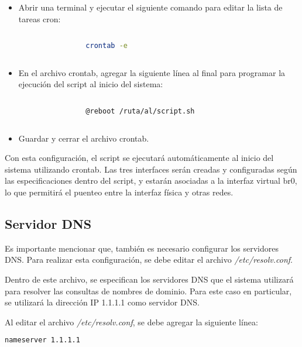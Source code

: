 		\begin{itemize}
		
			\item Abrir una terminal y ejecutar el siguiente comando para editar la lista de tareas cron:
	
			\begin{lstlisting}[language=Bash, caption=crontab]
	
				crontab -e
	
			\end{lstlisting}
	
			\item En el archivo crontab, agregar la siguiente línea al final para programar la ejecución del script al inicio del sistema:
	
			\begin{lstlisting}[language=Bash, caption=ruta del archivo]
	
				@reboot /ruta/al/script.sh
		
			\end{lstlisting}
	
			\item Guardar y cerrar el archivo crontab.
	
		\end{itemize}
	
		Con esta configuración, el script se ejecutará automáticamente al inicio del sistema utilizando crontab. Las tres interfaces serán creadas y configuradas según las especificaciones dentro del script, y estarán asociadas a la interfaz virtual br0, lo que permitirá el puenteo entre la interfaz física y otras redes.
					
		\subsection{Servidor DNS}
		
		
			Es importante mencionar que, también es necesario configurar los servidores DNS. Para realizar esta configuración, se debe editar el archivo \textit{/etc/resolv.conf}.\par

			Dentro de este archivo, se especifican los servidores DNS que el sistema utilizará para resolver las consultas de nombres de dominio. Para este caso en particular, se utilizará la dirección IP 1.1.1.1 como servidor DNS.

			Al editar el archivo \textit{/etc/resolv.conf}, se debe agregar la siguiente línea:
		
		
			\begin{lstlisting}[language=Bash, caption=Editar archivo resolv]		
				nameserver 1.1.1.1
			\end{lstlisting}
		

